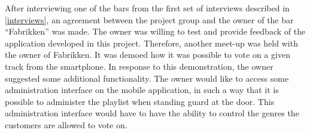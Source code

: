 After interviewing one of the bars from the first set of interviews described in \cref{interviews}, an agreement between the project group and the owner of the bar \enquote{Fabrikken} was made. The owner was willing to test and provide feedback of the application developed in this project. Therefore, another meet-up was held with the owner of Fabrikken. It was demoed how it was possible to vote on a given track from the smartphone. In response to this demonstration, the owner suggested some additional functionality. The owner would like to access some administration interface on the mobile application, in such a way that it is possible to administer the playlist when standing guard at the door. This administration interface would have to have the ability to control the genres the customers are allowed to vote on.
